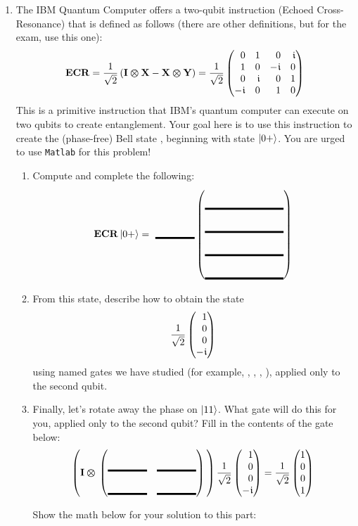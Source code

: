 \documentclass[12pt]{article}
\def\TwoQBlank{%
\DQB{\Blank[8em]}{\Blank[8em]}{\Blank[8em]}{\Blank[8em]}%
}
\def\TwoU{%
\SQBG{\relax}{\Blank[4em]{}}{\Blank[4em]{}}{\Blank[4em]{}}{\Blank[4em]{}}}
\begin{document}
\begin{enumerate}
\item{} The IBM Quantum Computer offers a two-qubit instruction \href{https://docs.quantum.ibm.com/api/qiskit/qiskit.circuit.library.ECRGate}{} (Echoed Cross-Resonance) that is defined as follows (there are other definitions, but for the exam, use this one):
\[
\NamedGate{ECR} = \RootTwo\left({\TensProd{\Identity}{\PauliX} - \TensProd{\PauliX}{\PauliY}}\right) = \RootTwo{}\begin{pmatrix*}[r]
0 & 1 & 0 & \NiceI{} \\
1 & 0 & -\NiceI{} & 0 \\
0 & \NiceI{} & 0 & 1 \\
-\NiceI{} & 0 & 1 & 0
\end{pmatrix*}
\]
This is a primitive instruction that IBM's quantum computer can execute on two qubits to create entanglement.  Your goal here is to use this instruction to create the (phase-free) Bell state , beginning with state $\ket{0+}$.  You are urged to use \texttt{Matlab} for this problem!
\begin{enumerate}[label=\theenumi.\arabic*]
    \item Compute and complete the following:
    \[ \NamedGate{ECR} \ket{0+} = \ \Blank[4em]{}\TwoQBlank \]
    \item From this state, describe how to obtain the state \[
    \RootTwo{}\DQB{1}{0}{0}{-\NiceI}
    \]
    using named gates we have studied (for example, \Hadamard{}, \PauliX{}, \PauliZ{}, \PauliY{}), applied only to the second qubit.
    \LeaveSpace{}
    \item Finally, let's rotate away the phase on $\ket{11}$.  What gate will do this for you, applied only to the second qubit?  Fill in the contents of the gate below:
    \[ \left(\TensProd{\Identity}{\TwoU{}}\right)\RootTwo{}\DQB{1}{0}{0}{-\NiceI} = \RootTwo{}\DQB{1}{0}{0}{1} \]

    Show the math below for your solution to this part:
    \LeaveSpace{}

\end{enumerate}

\end{enumerate}
\end{document}
